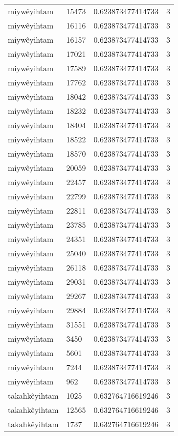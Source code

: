 \begin{longtable}{llll}
miywêyihtam & 15473 & 0.623873477414733 & 3 \\
miywêyihtam & 16116 & 0.623873477414733 & 3 \\
miywêyihtam & 16157 & 0.623873477414733 & 3 \\
miywêyihtam & 17021 & 0.623873477414733 & 3 \\
miywêyihtam & 17589 & 0.623873477414733 & 3 \\
miywêyihtam & 17762 & 0.623873477414733 & 3 \\
miywêyihtam & 18042 & 0.623873477414733 & 3 \\
miywêyihtam & 18232 & 0.623873477414733 & 3 \\
miywêyihtam & 18404 & 0.623873477414733 & 3 \\
miywêyihtam & 18522 & 0.623873477414733 & 3 \\
miywêyihtam & 18570 & 0.623873477414733 & 3 \\
miywêyihtam & 20059 & 0.623873477414733 & 3 \\
miywêyihtam & 22457 & 0.623873477414733 & 3 \\
miywêyihtam & 22799 & 0.623873477414733 & 3 \\
miywêyihtam & 22811 & 0.623873477414733 & 3 \\
miywêyihtam & 23785 & 0.623873477414733 & 3 \\
miywêyihtam & 24351 & 0.623873477414733 & 3 \\
miywêyihtam & 25040 & 0.623873477414733 & 3 \\
miywêyihtam & 26118 & 0.623873477414733 & 3 \\
miywêyihtam & 29031 & 0.623873477414733 & 3 \\
miywêyihtam & 29267 & 0.623873477414733 & 3 \\
miywêyihtam & 29884 & 0.623873477414733 & 3 \\
miywêyihtam & 31551 & 0.623873477414733 & 3 \\
miywêyihtam & 3450 & 0.623873477414733 & 3 \\
miywêyihtam & 5601 & 0.623873477414733 & 3 \\
miywêyihtam & 7244 & 0.623873477414733 & 3 \\
miywêyihtam & 962 & 0.623873477414733 & 3 \\
takahkêyihtam & 1025 & 0.632764716619246 & 3 \\
takahkêyihtam & 12565 & 0.632764716619246 & 3 \\
takahkêyihtam & 1737 & 0.632764716619246 & 3 \\

\end{longtable}
